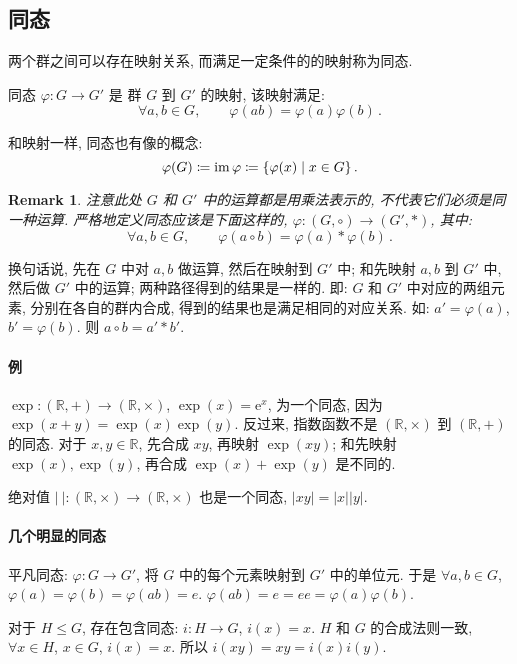 \documentclass[UTF8]{ctexart}
\theoremstyle{mystyle}
\theoremstyle{myremark}
\newtheorem*{remark}{Remark}
\theoremstyle{plain}
\newcommand{\mr}{\mathrm}
\newcommand{\R}{\mathbb R}
\DeclareMathOperator{\im}{im}
\DeclarePairedDelimiter\set{\{}{\}}
\begin{document}
\subsection{同态}
两个群之间可以存在映射关系, 而满足一定条件的的映射称为同态.
\begin{definition}
    同态 $ \varphi \colon G \to G' $ 是 群 $ G $ 到 $ G' $ 的映射, 该映射满足:
    \[ \forall a, b \in G, \qquad \varphi(a b) = \varphi(a) \varphi(b) \,.\]

    和映射一样, 同态也有像的概念:
    \[ \varphi(G) \coloneqq \im \varphi \coloneqq \set{\varphi(x) \mid x \in G} \,.\]
\end{definition}

\begin{remark}
    注意此处 $ G $ 和 $ G' $ 中的运算都是用乘法表示的, 不代表它们必须是同一种运算. 严格地定义同态应该是下面这样的, $ \varphi \colon (G, \circ) \to (G', *) $, 其中:
    \[ \forall a, b \in G, \qquad \varphi(a \circ b) = \varphi(a) * \varphi(b) \,.\]
\end{remark}

换句话说, 先在 $ G $ 中对 $ a, b $ 做运算, 然后在映射到 $ G' $ 中; 和先映射 $ a, b $ 到 $ G' $ 中, 然后做 $ G' $ 中的运算; 两种路径得到的结果是一样的. 即: $ G $ 和 $ G' $ 中对应的两组元素, 分别在各自的群内合成, 得到的结果也是满足相同的对应关系. 如: $ a' = \varphi(a) $, $ b' = \varphi(b) $. 则 $ a \circ b = a' * b' $.

\paragraph{例}
$ \exp \colon (\R, +) \to (\R, \times) $, $ \exp(x) = \mr e^x $, 为一个同态, 因为 $ \exp(x + y) = \exp (x) \exp (y) $. 反过来, 指数函数不是 $ (\R, \times) $ 到 $ (\R, +) $ 的同态. 对于 $ x, y \in \R $, 先合成 $ x y $, 再映射 $ \exp (x y) $; 和先映射 $ \exp(x), \exp(y) $, 再合成 $ \exp(x) + \exp(y) $ 是不同的.

绝对值 $ |~| \colon (\R, \times) \to (\R, \times) $ 也是一个同态, $ |x y| = |x| |y| $.

\paragraph{几个明显的同态}
平凡同态: $ \varphi \colon G \to G' $, 将 $ G $ 中的每个元素映射到 $ G' $ 中的单位元. 于是 $ \forall a, b \in G $, $ \varphi(a) = \varphi(b) = \varphi(a b) = e $. $ \varphi(a b) = e = ee = \varphi(a) \varphi(b) $.

对于 $ H \le G $, 存在包含同态: $ i \colon H \to G $, $ i(x) = x $. $ H $ 和 $ G $ 的合成法则一致, $ \forall x \in H $, $ x \in G $, $ i(x) = x $. 所以 $ i (x y) = x y = i(x) i(y) $.
\end{document}
